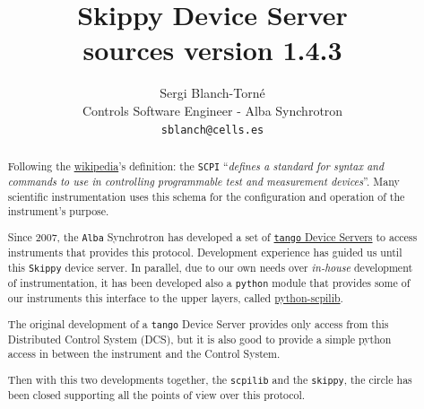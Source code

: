 \documentclass[a4paper,10pt]{article}
\title{Skippy Device Server \\
\large sources version 1.4.3}
\author{Sergi Blanch-Torn\'e\\\small{Controls Software Engineer - Alba Synchrotron}\\{\tt \small{sblanch@cells.es}}}
\begin{document}
\maketitle

\begin{abstract}
Following the \href{https://en.wikipedia.org/wiki/Standard_Commands_for_Programmable_Instruments}{wikipedia}'s definition:  the \texttt{SCPI} ``\emph{defines a standard for syntax and commands to use in controlling programmable test and measurement devices}''. Many scientific instrumentation uses this schema for the configuration and operation of the instrument's purpose.

Since 2007, the \texttt{Alba} Synchrotron has developed a set of \href{http://tango.controls.org}{\texttt{tango} Device Servers} to access instruments that provides this protocol. Development experience has guided us until this \texttt{Skippy} device server. In parallel, due to our own needs over \emph{in-house} development of instrumentation, it has been developed also a \texttt{python} module that provides some of our instruments this interface to the upper layers, called \href{https://github.com/srgblnch/python-scpilib}{python-scpilib}.

The original development of a \texttt{tango} Device Server provides only access from this Distributed Control System (DCS), but it is also good to provide a simple python access in between the instrument and the Control System.

Then with this two developments together, the \texttt{scpilib} and the \texttt{skippy}, the circle has been closed supporting all the points of view over this protocol.


\end{abstract}
\end{document}
